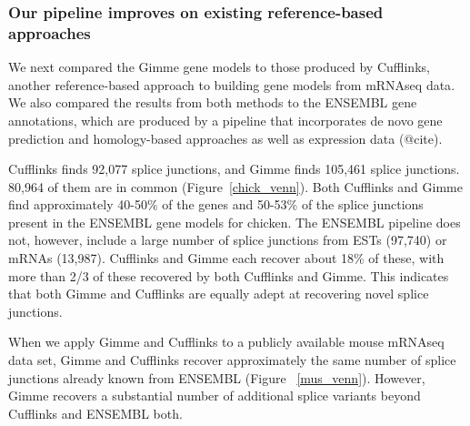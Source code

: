 \documentclass[10pt]{article}
\begin{document}

\subsubsection*{Our pipeline improves on existing reference-based approaches}

We next compared the Gimme gene models to those produced by Cufflinks,
another reference-based approach to building gene models from mRNAseq
data\cite{Trapnell:2010kd}.  We also compared the results from both
methods to the ENSEMBL gene annotations, which are produced by a
pipeline that incorporates de novo gene prediction and homology-based
approaches as well as expression data (@cite).

Cufflinks finds 92,077 splice junctions, and Gimme finds 105,461 splice
junctions.  80,964 of them are in common (Figure~\ref{chick_venn}). Both
Cufflinks and Gimme find approximately 40-50\% of the genes and 50-53\% of the
splice junctions present in the ENSEMBL gene models for chicken.  The ENSEMBL
pipeline does not, however, include a large number of splice junctions from ESTs
(97,740) or mRNAs (13,987).  Cufflinks and Gimme each recover about 18\% of
these, with more than 2/3 of these recovered by both Cufflinks and Gimme.  This
indicates that both Gimme and Cufflinks are equally adept at recovering novel
splice junctions.



When we apply Gimme and Cufflinks to a publicly available mouse mRNAseq data
set, Gimme and Cufflinks recover approximately the same number of splice
junctions already known from ENSEMBL (Figure ~\ref{mus_venn}).  However, Gimme
recovers a substantial number of additional splice variants beyond Cufflinks and
ENSEMBL both.


\end{document}
